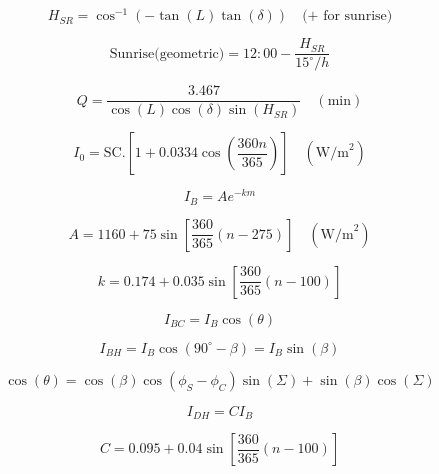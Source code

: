 \documentclass[12pt]{article}
\begin{document}
\begin{equation}
\label{sunrise3}
H_{SR}=\cos^{-1}{(-\tan{(L)}\tan{(\delta)})} \quad \text{(+ for sunrise)}
\end{equation}

\begin{equation}
\label{sunrise4}
\text{Sunrise(geometric)}= 12:00-\frac{H_{SR}}{15^{\circ}/h}
\end{equation}

\begin{equation}
\label{sunrise5}
Q=\frac{3.467}{\cos{(L)}\cos{(\delta)}\sin{(H_{SR})}} \quad (\text{min})
\end{equation}

\begin{equation}
\label{etr1}
I_{0}=\text{SC}. \left[1+0.0334\cos\left(\frac{360n}{365}\right)\right] \quad (\text{W/m}^{2})
\end{equation}

\begin{equation}
\label{beam1}
I_{B}=Ae^{-km}
\end{equation}

\begin{equation}
\label{beam2}
A=1160+75\sin\left[\frac{360}{365}(n-275)\right] \quad (\text{W/m}^{2})
\end{equation}

\begin{equation}
\label{beam3}
k=0.174+0.035\sin\left[\frac{360}{365}(n-100)\right]
\end{equation}

\begin{equation}
\label{beamc1}
I_{BC}=I_{B}\cos{(\theta)}
\end{equation}

\begin{equation}
\label{beamc2}
I_{BH}=I_{B}\cos{(90^{\circ}-\beta)}=I_{B}\sin{(\beta)}
\end{equation}

\begin{equation}
\label{beamc3}
\cos{(\theta)}=\cos{(\beta)}\cos{(\phi_{S}-\phi_{C})}\sin{(\Sigma)}+\sin{(\beta)}\cos{(\Sigma)}
\end{equation}

\begin{equation}
\label{diff1}
I_{DH}=CI_{B}
\end{equation}

\begin{equation}
\label{diff2}
C=0.095+0.04\sin\left[\frac{360}{365}(n-100)\right]
\end{equation}
\end{document}

